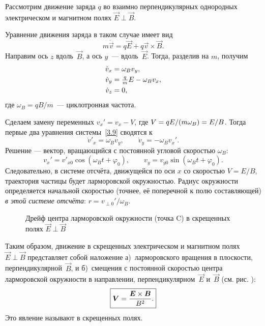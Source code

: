 Рассмотрим движение заряда $q$ во взаимно перпендикулярных однородных
электрическом и магнитном полях $\vec{E}\perp\vec{B}$.

Уравнение движения заряда в таком случае имеет вид
\[
m\dot{\vec{v}} = q\vec{E} + q \vec{v}\times \vec{B}.
\]
Направим ось $z$ вдоль~$\vec{B}$, а ось $y$~--- вдоль~$\vec{E}$.
Тогда, разделив на $m$, получим
\begin{equation}
    \eqmark{3.9}
    \begin{aligned}
        \dot{v}_x&=\omega_B v_y,\\
        \dot{v}_y&=\tfrac{q}{m}E-\omega_B v_x,\\
        \dot{v}_z&=0,
\end{aligned}
\end{equation}
где $\omega_B = qB/m$~--- циклотронная частота.

Сделаем замену переменных $v_x' = v_x - V$,
где $V=qE/(m\omega_B) \hm= E/B$. Тогда первые два уравнения системы~\eqref{3.9}
сводятся к 
\[
\dot{v}'_x =\omega_B v_y,\qquad \dot{v}_y =-\omega_B v_x'.
\]
Решение --- вектор, вращающийся с постоянной угловой скоростью $\omega_B$:
\begin{equation*}
 v_x' = v'_{x0} \cos(\omega_B t + \varphi_0),\qquad
 v_y = v_{y0} \sin(\omega_B t + \varphi_0).
\end{equation*}
Следовательно, в системе отсчёта, движущейся по оси $x$ со скоростью
$V=E/B$, траектория частицы будет ларморовской окружностью.
Радиус окружности определяется начальной скоростью (точнее, её поперечной
к полю составляющей) \emph{в этой системе отсчёта}: $r=v_{\perp 0}'/\omega_B$.

\begin{figure}[h]
\centering
{}
\caption{Дрейф центра ларморовской окружности (точка C) в скрещенных полях
    $\vec{E}\perp\vec{B}$}
\end{figure}

Таким образом, движение в скрещенных электрическом и магнитном полях
$\vec{E}\perp \vec{B}$ представляет собой наложение
а)~ларморовского вращения в плоскости, перпендикулярной~$\vec{B}$,
и б)~смещения с постоянной скоростью центра ларморовской
окружности в направлении, перпендикулярном~$\vec{E}$ и~$\vec{B}$
 (см. рис. ):
\begin{equation}
\eqmark{Edrift}
    \boxed{\vec{V} = \frac{\vec{E}\times \vec{B}}{B^2}.}
\end{equation}
Это явление называют  
в скрещенных полях.

